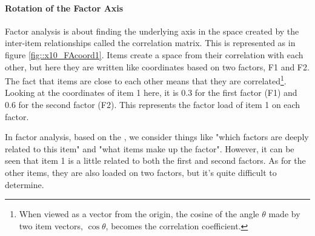 \documentclass{ltjsbook}
\begin{document}
\paragraph{Rotation of the Factor Axis}
Factor analysis is about finding the underlying axis in the space created by the inter-item relationships called the correlation matrix. This is represented as in figure \ref{fig::x10_FAcoord1}.
Items create a space from their correlation with each other, but here they are written like coordinates based on two factors, F1 and F2. The fact that items are close to each other means that they are correlated\footnote{When viewed as a vector from the origin, the cosine of the angle $\theta$ made by two item vectors, $\cos \theta$, becomes the correlation coefficient.}. Looking at the coordinates of item 1 here, it is 0.3 for the first factor (F1) and 0.6 for the second factor (F2). This represents the factor load of item 1 on each factor.


In factor analysis, based on the , we consider things like "which factors are deeply related to this item" and "what items make up the factor". However, it can be seen that item 1 is a little related to both the first and second factors. As for the other items, they are also loaded on two factors, but it's quite difficult to determine.
\end{document}
